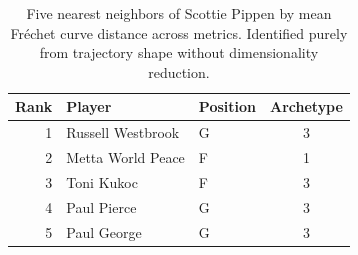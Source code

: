 \begin{table}[htbp]
  \centering\small
  \begin{tabular}{rllc}
    \toprule
    Rank & Player & Position & Archetype \\
    \midrule
    1 & Russell Westbrook & G & 3 \\
    2 & Metta World Peace & F & 1 \\
    3 & Toni Kukoc & F & 3 \\
    4 & Paul Pierce & G & 3 \\
    5 & Paul George & G & 3 \\
    \bottomrule
  \end{tabular}
  \caption{Five nearest neighbors of Scottie Pippen by mean Fr\'{e}chet curve distance across metrics. Identified purely from trajectory shape without dimensionality reduction.}
  \label{tab:Scottie_Pippen_frechet_curve_neighbors}
\end{table}

